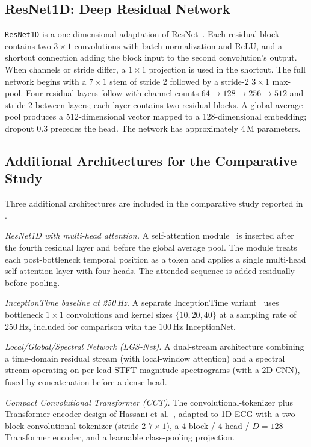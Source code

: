 \subsection{ResNet1D: Deep Residual Network}
\label{sec:resnet1d}

\texttt{ResNet1D} is a one-dimensional adaptation of ResNet~\cite{he2016deep}. Each residual block contains two $3\times 1$ convolutions with batch normalization and ReLU, and a shortcut connection adding the block input to the second convolution's output. When channels or stride differ, a $1\times 1$ projection is used in the shortcut. The full network begins with a $7\times 1$ stem of stride 2 followed by a stride-2 $3\times 1$ max-pool. Four residual layers follow with channel counts $64 \to 128 \to 256 \to 512$ and stride 2 between layers; each layer contains two residual blocks. A global average pool produces a 512-dimensional vector mapped to a 128-dimensional embedding; dropout $0.3$ precedes the head. The network has approximately 4\,M parameters.

\subsection{Additional Architectures for the Comparative Study}

Three additional architectures are included in the comparative study reported in .

\textit{ResNet1D with multi-head attention.} A self-attention module~\cite{vaswani2017attention} is inserted after the fourth residual layer and before the global average pool. The module treats each post-bottleneck temporal position as a token and applies a single multi-head self-attention layer with four heads. The attended sequence is added residually before pooling.

\textit{InceptionTime baseline at 250\,Hz.} A separate InceptionTime variant~\cite{ismail2020inception} uses bottleneck $1\times 1$ convolutions and kernel sizes $\{10, 20, 40\}$ at a sampling rate of $250$\,Hz, included for comparison with the $100$\,Hz InceptionNet.

\textit{Local/Global/Spectral Network (LGS-Net).} A dual-stream architecture combining a time-domain residual stream (with local-window attention) and a spectral stream operating on per-lead STFT magnitude spectrograms (with a 2D CNN), fused by concatenation before a dense head.

\textit{Compact Convolutional Transformer (CCT).} The convolutional-tokenizer plus Transformer-encoder design of Hassani et al.~\cite{hassani2021escaping}, adapted to 1D ECG with a two-block convolutional tokenizer (stride-2 $7\times 1$), a 4-block / 4-head / $D{=}128$ Transformer encoder, and a learnable class-pooling projection.

